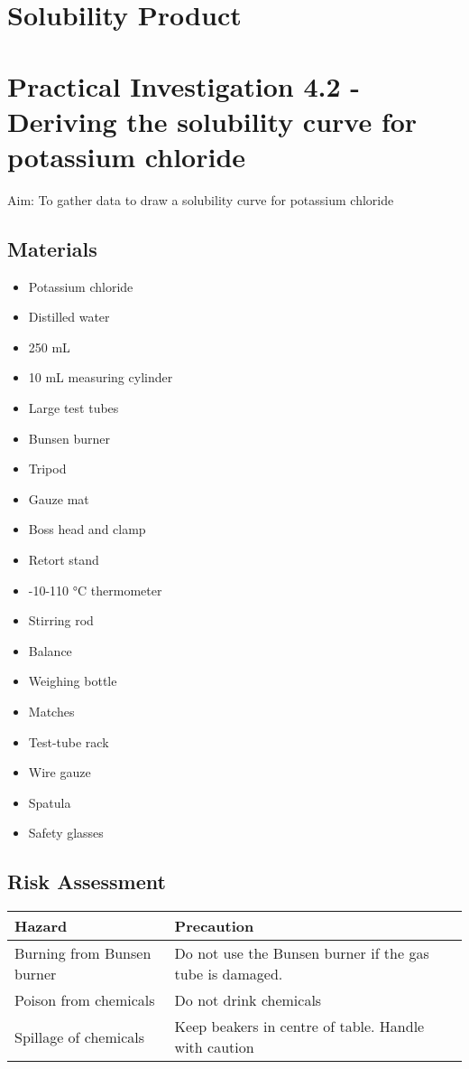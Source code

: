 \section{Solubility Product}


\section{Practical Investigation 4.2 - Deriving the solubility curve for potassium chloride}
	Aim: To gather data to draw a solubility curve for potassium chloride

	\subsection{Materials}
		\begin{itemize}
			\item Potassium chloride
			\item Distilled water
			\item 250 mL
			\item 10 mL measuring cylinder
			\item Large test tubes
			\item Bunsen burner
			\item Tripod
			\item Gauze mat
			\item Boss head and clamp
			\item Retort stand
			\item -10-110 $\unit{\degreeCelsius}$ thermometer
			\item Stirring rod
			\item Balance
			\item Weighing bottle
			\item Matches
			\item Test-tube rack
			\item Wire gauze
			\item Spatula
			\item Safety glasses
		\end{itemize}

	\subsection{Risk Assessment}
		\begin{table}[H]
			\centering
			\begin{tabular}{ll}
				\hline
				Hazard & Precaution \\ \hline
				Burning from Bunsen burner & Do not use the Bunsen burner if the gas tube is damaged. \\
				Poison from chemicals & Do not drink chemicals \\
				Spillage of chemicals & Keep beakers in centre of table. Handle with caution
			\end{tabular}
		\end{table}

